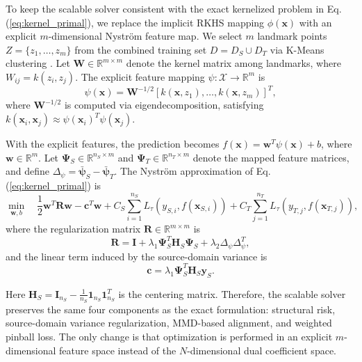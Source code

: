 \documentclass[a4paper]{cas-sc}
\begin{document}
To keep the scalable solver consistent with the exact kernelized problem in Eq. (\ref{eq:kernel_primal}), we replace the implicit RKHS mapping $\phi(\boldsymbol{x})$ with an explicit $m$-dimensional Nystr\"{o}m feature map. We select $m$ landmark points $Z = \{z_1, \ldots, z_m\}$ from the combined training set $D = D_S \cup D_T$ via K-Means clustering \citep{zhang2010clustered}. Let $\boldsymbol{W} \in \mathbb{R}^{m \times m}$ denote the kernel matrix among landmarks, where $W_{ij} = k(z_i, z_j)$. The explicit feature mapping $\psi: \mathcal{X} \to \mathbb{R}^m$ is
\begin{equation}
\label{eq:nystrom_feature}
\psi(\boldsymbol{x}) = \boldsymbol{W}^{-1/2} [k(\boldsymbol{x}, z_1), \ldots, k(\boldsymbol{x}, z_m)]^T,
\end{equation}
where $\boldsymbol{W}^{-1/2}$ is computed via eigendecomposition, satisfying $k(\boldsymbol{x}_i, \boldsymbol{x}_j) \approx \psi(\boldsymbol{x}_i)^T \psi(\boldsymbol{x}_j)$.

With the explicit features, the prediction becomes $f(\boldsymbol{x}) = \boldsymbol{w}^T \psi(\boldsymbol{x}) + b$, where $\boldsymbol{w} \in \mathbb{R}^m$. Let $\boldsymbol{\Psi}_S \in \mathbb{R}^{n_S \times m}$ and $\boldsymbol{\Psi}_T \in \mathbb{R}^{n_T \times m}$ denote the mapped feature matrices, and define $\Delta_{\psi} = \bar{\boldsymbol{\psi}}_S - \bar{\boldsymbol{\psi}}_T$. The Nystr\"{o}m approximation of Eq. (\ref{eq:kernel_primal}) is
\begin{equation}
\label{eq:nystrom_primal}
\min_{\boldsymbol{w}, b} \quad \frac{1}{2}\boldsymbol{w}^T \boldsymbol{R} \boldsymbol{w} - \boldsymbol{c}^T \boldsymbol{w}
+ C_S \sum_{i=1}^{n_S} L_{\tau}(y_{S,i}, f(\boldsymbol{x}_{S,i}))
+ C_T \sum_{j=1}^{n_T} L_{\tau}(y_{T,j}, f(\boldsymbol{x}_{T,j})),
\end{equation}
where the regularization matrix $\boldsymbol{R} \in \mathbb{R}^{m \times m}$ is
\begin{equation}
\label{eq:reg_matrix}
\boldsymbol{R} = \boldsymbol{I} + \lambda_1 \boldsymbol{\Psi}_S^T \boldsymbol{H}_S \boldsymbol{\Psi}_S + \lambda_2 \Delta_{\psi}\Delta_{\psi}^T,
\end{equation}
and the linear term induced by the source-domain variance is
\begin{equation}
\label{eq:nystrom_linear}
\boldsymbol{c} = \lambda_1 \boldsymbol{\Psi}_S^T \boldsymbol{H}_S \boldsymbol{y}_S.
\end{equation}

Here $\boldsymbol{H}_S = \boldsymbol{I}_{n_S} - \frac{1}{n_S} \boldsymbol{1}_{n_S} \boldsymbol{1}_{n_S}^T$ is the centering matrix. Therefore, the scalable solver preserves the same four components as the exact formulation: structural risk, source-domain variance regularization, MMD-based alignment, and weighted pinball loss. The only change is that optimization is performed in an explicit $m$-dimensional feature space instead of the $N$-dimensional dual coefficient space.
\end{document}
